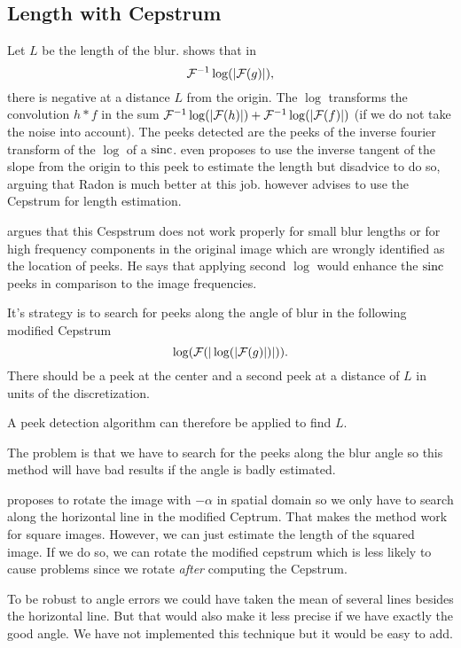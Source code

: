 \subsection{Length with Cepstrum}
\label{subsec:Cep}
Let $L$ be the length of the blur.
\cite{biemond1990iterative} shows that in%
\[ \mathcal{F}^{-1}\log(|\mathcal{F}(g)|), \]
there is negative at a distance $L$ from the origin.
The $\log$ transforms the convolution $h*f$ in the sum
$\mathcal{F}^{-1}\log(|\mathcal{F}(h)|) + \mathcal{F}^{-1}\log(|\mathcal{F}(f)|)$
(if we do not take the noise into account).
The peeks detected are the peeks of the inverse fourier
transform of the $\log$ of a $\operatorname{sinc}$.
\cite{krahmer2006blind} even proposes to use the inverse
tangent of the slope from the origin to this peek to
estimate the length but disadvice to do so,
arguing that Radon is much better at this job.
\cite{krahmer2006blind} however advises to use the Cepstrum
for length estimation.

\cite{Deshpande2014606} argues that this Cespstrum does
not work properly for small blur lengths or for high
frequency components in the original image which
are wrongly identified as the location of peeks.
He says that applying second $\log$ would enhance the $\operatorname{sinc}$ peeks
in comparison to the image frequencies.

It's strategy is to search for peeks
along the angle of blur in
the following modified Cepstrum
\[ \log(\mathcal{F}(|\log(|\mathcal{F}(g)|)|)). \]
There should be a peek at the center and a second peek
at a distance of $L$ in units of the discretization.

A peek detection algorithm can therefore be applied
to find $L$.

The problem is that we have to search for the peeks along
the blur angle so this method will have
bad results if the angle is badly estimated.

\cite{Deshpande2014606} proposes to rotate the image
with $-\alpha$ in spatial domain so we only have to
search along the horizontal line in the modified Ceptrum.
That makes the method work for square images.
However, we can just estimate the length of the squared image.
If we do so, we can rotate the modified cepstrum which is less
likely to cause problems since we rotate \emph{after}
computing the Cepstrum.

To be robust to angle errors we could have taken the mean of
several lines besides the horizontal line.
But that would also make it less precise if we have exactly
the good angle.
We have not implemented this technique but it would
be easy to add.


